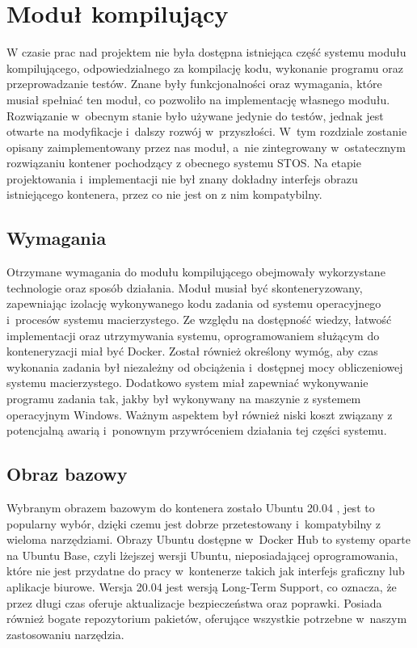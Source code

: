 \section{Moduł kompilujący}
W czasie prac nad projektem nie była dostępna istniejąca część systemu modułu kompilującego, odpowiedzialnego za kompilację kodu, wykonanie programu oraz przeprowadzanie testów. Znane były funkcjonalności oraz wymagania, które musiał spełniać ten moduł, co pozwoliło na implementację własnego modułu. Rozwiązanie w~obecnym stanie było używane jedynie do testów, jednak jest otwarte na modyfikacje i~dalszy rozwój w~przyszłości. W~tym rozdziale zostanie opisany zaimplementowany przez nas moduł, a~nie zintegrowany w~ostatecznym rozwiązaniu kontener pochodzący z obecnego systemu STOS. Na etapie projektowania i~implementacji nie był znany dokładny interfejs obrazu istniejącego kontenera, przez co nie jest on z nim kompatybilny. 

\subsection{Wymagania}
Otrzymane wymagania do modułu kompilującego obejmowały wykorzystane technologie oraz sposób działania. Moduł musiał być skonteneryzowany, zapewniając izolację wykonywanego kodu zadania od systemu operacyjnego i~procesów systemu macierzystego. Ze względu na dostępność wiedzy, łatwość implementacji oraz utrzymywania systemu, oprogramowaniem służącym do konteneryzacji miał być Docker. Został również określony wymóg, aby czas wykonania zadania był niezależny od obciążenia i~dostępnej mocy obliczeniowej systemu macierzystego. Dodatkowo system miał zapewniać wykonywanie programu zadania tak, jakby był wykonywany na maszynie z systemem operacyjnym Windows. Ważnym aspektem był również niski koszt związany z potencjalną awarią i~ponownym przywróceniem działania tej części systemu.

\subsection{Obraz bazowy}
Wybranym obrazem bazowym do kontenera zostało Ubuntu 20.04 \cite{linuxUbuntu}, jest to popularny wybór, dzięki czemu jest dobrze przetestowany i~kompatybilny z wieloma narzędziami. Obrazy Ubuntu dostępne w~Docker Hub to systemy oparte na Ubuntu Base, czyli lżejszej wersji Ubuntu, nieposiadającej oprogramowania, które nie jest przydatne do pracy w~kontenerze takich jak interfejs graficzny lub aplikacje biurowe. Wersja 20.04 jest wersją Long-Term Support, co oznacza, że przez długi czas oferuje aktualizacje bezpieczeństwa oraz poprawki. Posiada również bogate repozytorium pakietów, oferujące wszystkie potrzebne w~naszym zastosowaniu narzędzia.

